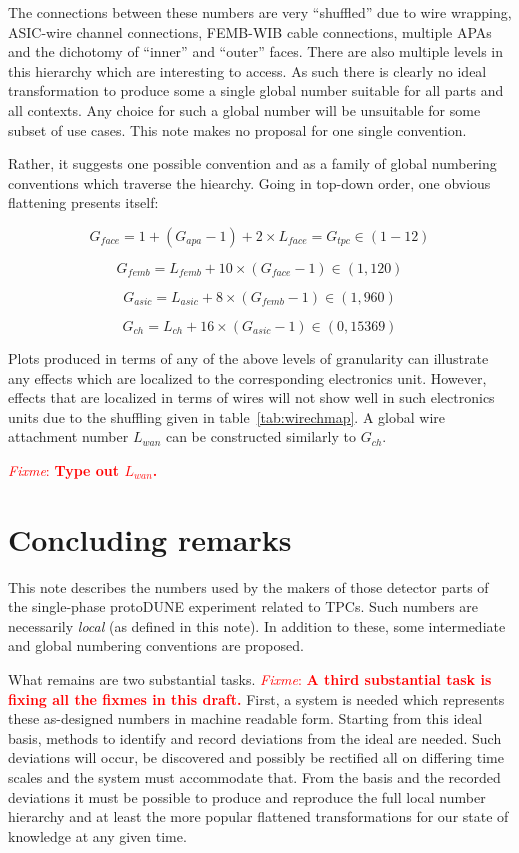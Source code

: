 \documentclass[pdftex,12pt,letter]{article}
\newcommand{\fixme}[1]{\textcolor{red}{\textit{Fixme}: \textbf{#1}}}
\begin{document}
The connections between these numbers are very ``shuffled'' due to
wire wrapping, ASIC-wire channel connections, FEMB-WIB cable
connections, multiple APAs and the dichotomy of ``inner'' and
``outer'' faces.  There are also multiple levels in this hierarchy
which are interesting to access.  As such there is clearly no ideal
transformation to produce some a single global number suitable for all
parts and all contexts.  Any choice for such a global number will be
unsuitable for some subset of use cases.  This note makes no proposal
for one single convention.

Rather, it suggests one possible convention and as a family of global
numbering conventions which traverse the hiearchy.  Going in top-down
order, one obvious flattening presents itself:

\[  G_{face} = 1 + (G_{apa}-1) + 2\times L_{face} = G_{tpc} \in (1-12) \]
  
\[  G_{femb} = L_{femb} + 10\times (G_{face}-1) \in (1,120) \]

\[  G_{asic} = L_{asic} + 8\times (G_{femb}-1) \in (1,960) \]

\[ G_{ch} = L_{ch} + 16\times (G_{asic}-1) \in (0,15369) \]

Plots produced in terms of any of the above levels of granularity can
illustrate any effects which are localized to the corresponding
electronics unit.  However, effects that are localized in terms of
wires will not show well in such electronics units due to the
shuffling given in table~\ref{tab:wirechmap}.  A global wire
attachment number $L_{wan}$ can be constructed similarly to $G_{ch}$.

\fixme{Type out $L_{wan}$.}

\section{Concluding remarks}

This note describes the numbers used by the makers of those detector
parts of the single-phase protoDUNE experiment related to TPCs.  Such
numbers are necessarily \textit{local} (as defined in this note).  In
addition to these, some intermediate and global numbering conventions
are proposed.

What remains are two substantial tasks.  \fixme{A third substantial
  task is fixing all the fixmes in this draft.}  First, a system is
needed which represents these as-designed numbers in machine readable
form.  Starting from this ideal basis, methods to identify and record
deviations from the ideal are needed.  Such deviations will occur, be
discovered and possibly be rectified all on differing time scales and
the system must accommodate that.  From the basis and the recorded
deviations it must be possible to produce and reproduce the full local
number hierarchy and at least the more popular flattened
transformations for our state of knowledge at any given time.
\end{document}
